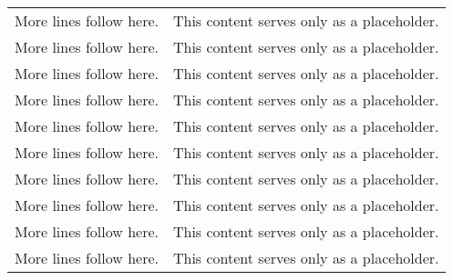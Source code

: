 \begin{block}
\begin{longtable}{@{}lp{}@{}}
    More lines follow here. & This content serves only as a placeholder. \\
		More lines follow here. & This content serves only as a placeholder. \\
    More lines follow here. & This content serves only as a placeholder. \\
    More lines follow here. & This content serves only as a placeholder. \\
    More lines follow here. & This content serves only as a placeholder. \\
    More lines follow here. & This content serves only as a placeholder. \\
    More lines follow here. & This content serves only as a placeholder. \\
    More lines follow here. & This content serves only as a placeholder. \\
    More lines follow here. & This content serves only as a placeholder. \\
    More lines follow here. & This content serves only as a placeholder. \\
    \bottomrule
\end{longtable}
\end{block}

